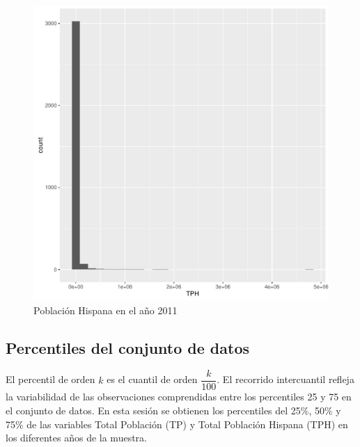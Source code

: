 \documentclass[conference]{IEEEtran}\usepackage[]{graphicx}\usepackage[]{color}
\makeatletter
\def\maxwidth{ %
  \ifdim\Gin@nat@width>\linewidth
    \linewidth
  \else
    \Gin@nat@width
  \fi
}
\newenvironment{knitrout}{}{} %
\makeatother
\begin{document}
\begin{figure}[H]
	\centering
\begin{knitrout}
\color{fgcolor}
\includegraphics[width=\maxwidth]{figure/pobHisp2011-1} 

\end{knitrout}
	\caption{Población Hispana en el año 2011}
\end{figure}

\subsection{Percentiles del conjunto de datos}
El percentil de orden \(k\) es el cuantil de orden \(\dfrac {k} {100}\). El recorrido intercuantil refleja la variabilidad de las observaciones comprendidas entre los percentiles 25 y 75 en el conjunto de datos. En esta sesión se obtienen los percentiles del 25\%,  50\% y 75\% de las variables Total Población (TP) y Total Población Hispana (TPH) en los diferentes años de la muestra.
\end{document}
